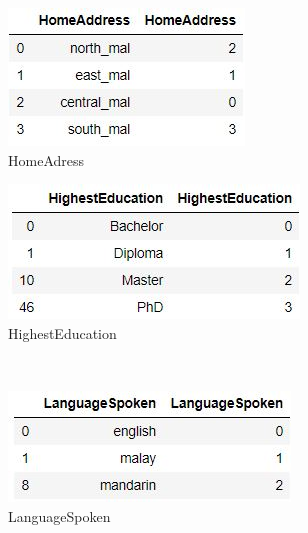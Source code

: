 \documentclass[11pt]{article}
\begin{document}
\begin{figure}[H]
\centering
\begin{subfigure}{.5\textwidth}
  \centering
  \includegraphics[width=.8\linewidth]{LabelEncodingAddress}
  \caption{HomeAdress}
  \label{fig:LabelEncodingAddress}
\end{subfigure}%
\begin{subfigure}{.6\textwidth}
  \centering
  \includegraphics[width=.8\linewidth]{LabelEncodingEdu}
  \caption{HighestEducation}
  \label{fig:LabelEncodingEdu}
\end{subfigure}
\label{fig:test}
\\
\centering
\begin{subfigure}{.5\textwidth}
  \centering
  \includegraphics[width=.9\linewidth]{LabelEncodingLanguage}
  \caption{LanguageSpoken}
  \label{fig:LabelEncodingAddress}
\end{subfigure}%
\begin{subfigure}{.5\textwidth}

\end{subfigure}
\end{figure}
\end{document}
